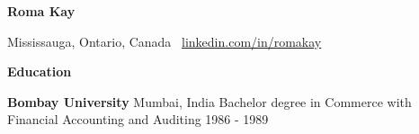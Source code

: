 \documentclass[11pt]{article}
\begin{document}
\begin{center}
    \textbf{Roma Kay}\\ 
    \hrulefill
\end{center}

\begin{center}
    Mississauga, Ontario, Canada \textbullet \ \href{https://linkedin.com/in/romakay}{linkedin.com/in/romakay}
\end{center}

\vspace{0.5pt}

\begin{center}
    \textbf{Education}
\end{center}
\textbf{Bombay University} \hfill Mumbai, India
Bachelor degree in Commerce with Financial Accounting and Auditing \hfill 1986 - 1989
\vspace{4pt}

\vspace{12pt}
\end{document}
